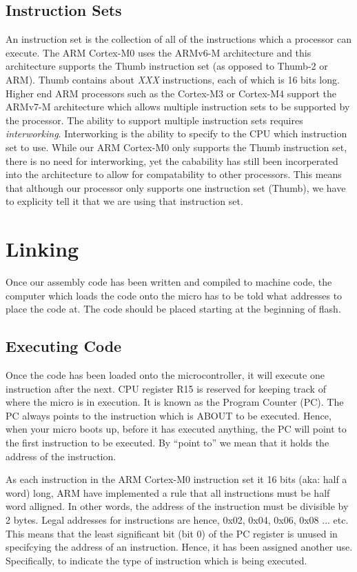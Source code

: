 \subsection{Instruction Sets}
An instruction set is the collection of all of the instructions which a processor can execute. 
The ARM Cortex-M0 uses the ARMv6-M architecture and this architecture supports the Thumb instruction set (as opposed to Thumb-2 or ARM). 
Thumb contains about \emph{XXX} instructions, each of which is 16 bits long. \\

Higher end ARM processors such as the Cortex-M3 or Cortex-M4 support the ARMv7-M architecture which allows multiple instruction sets to be supported by the processor. 
The ability to support multiple instruction sets requires \emph{interworking}. Interworking is the ability to specify to the CPU which instruction set to use. 
While our ARM Cortex-M0 only supports the Thumb instruction set, there is no need for interworking, yet the cabability has still been incorperated into the architecture to allow for compatability to other processors. 
This means that although our processor only supports one instruction set (Thumb), we have to explicity tell it that we are using that instruction set. 


\section{Linking}
Once our assembly code has been written and compiled to machine code, the computer which loads the code onto the micro has to be told what addresses to place the code at. The code should be placed starting at the beginning of flash.

\subsection{Executing Code}
Once the code has been loaded onto the microcontroller, it will execute one instruction after the next. 
CPU register R15 is reserved for keeping track of where the micro is in execution. It is known as the Program Counter (PC).
The PC always points to the instruction which is ABOUT to be executed. Hence, when your micro boots up, before it has executed anything, the PC will point to the first instruction to be executed.
By ``point to'' we mean that it holds the address of the instruction. 

As each instruction in the ARM Cortex-M0 instruction set it 16 bits (aka: half a word) long, ARM have implemented a rule that all instructions must be half word alligned. In other words, the address of the instruction must be divisible by 2 bytes. Legal addresses for instructions are hence, 0x02, 0x04, 0x06, 0x08 ... etc. 
This means that the least significant bit (bit 0) of the PC register is unused in specifcying the address of an instruction. 
Hence, it has been assigned another use. Specifically, to indicate the type of instruction which is being executed. 


